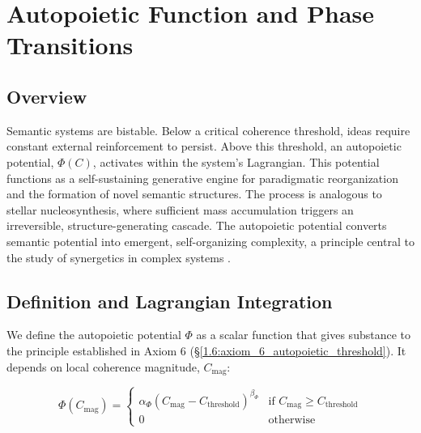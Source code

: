 \chapter{Autopoietic Function and Phase Transitions}
\label{7:autopoietic_function_and_phase_transitions}


\section{Overview}
\label{7.1:overview}

Semantic systems are bistable. Below a critical coherence threshold, ideas require constant external reinforcement to persist. Above this threshold, an autopoietic potential, \(\Phi(C)\), activates within the system's Lagrangian. This potential functions as a self-sustaining generative engine for paradigmatic reorganization and the formation of novel semantic structures. The process is analogous to stellar nucleosynthesis, where sufficient mass accumulation triggers an irreversible, structure-generating cascade. The autopoietic potential converts semantic potential into emergent, self-organizing complexity, a principle central to the study of synergetics in complex systems \autocite{Haken1983}.


\section{Definition and Lagrangian Integration}
\label{7.2:definition_and_lagrangian_integration}

We define the autopoietic potential \(\Phi\) as a scalar function that gives substance to the principle established in Axiom 6 (\S\ref{1.6:axiom_6_autopoietic_threshold}). It depends on local coherence magnitude, \(C_{\mathrm{mag}}\):

\begin{equation}\label{eq:autopoietic_potential}
\Phi(C_{\mathrm{mag}}) =
\begin{cases}
\alpha_{\Phi} (C_{\mathrm{mag}} - C_{\text{threshold}})^{\beta_{\Phi}} & \text{if } C_{\mathrm{mag}} \geq C_{\text{threshold}} \\
0 & \text{otherwise}
\end{cases}
\end{equation}

